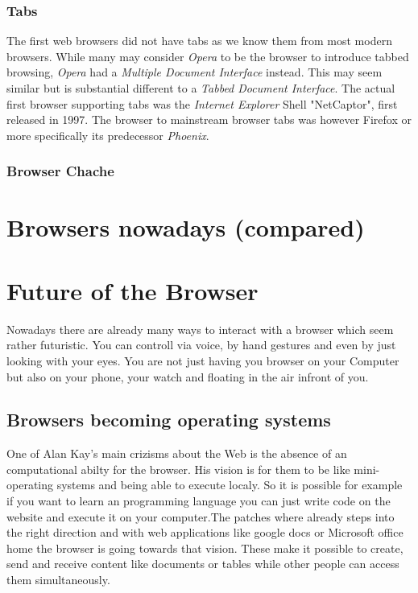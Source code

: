 \documentclass[runningheads]{llncs}
\begin{document}
			\subsubsection{Tabs}
			The first web browsers did not have tabs as we know them from most modern browsers. While many may consider \textit{Opera} to be the browser to introduce tabbed browsing, \textit{Opera} had a  \textit{Multiple Document Interface} instead. This may seem similar but is substantial different to a \textit{Tabbed Document Interface}. The actual first browser supporting tabs was the \textit{Internet Explorer} Shell "NetCaptor", first released in 1997. The browser to mainstream browser tabs was however Firefox or more specifically its predecessor \textit{Phoenix}.
			\subsubsection{Browser Chache}


	\section{Browsers nowadays (compared)}
	\section{Future of the Browser}
	Nowadays there are already many ways to interact with a browser which seem rather futuristic. You can controll via voice, by hand gestures and even by just looking with your eyes. You are not just having you browser on your Computer but also on your phone, your watch and floating in the air infront of you.
		\subsection{Browsers becoming operating systems}
		One of Alan Kay's main crizisms about the Web is the absence of an computational abilty for the browser. His vision is for them to be like  mini-operating systems and being able to execute localy. So it is possible for example if you want to learn an programming language you can just write code on the website and execute it on your computer.The patches where already steps into the right direction and with web applications like google docs or Microsoft office home the browser is going towards that vision. These make it possible to create, send and receive content like documents or tables while other people can access them simultaneously.
		
\end{document}
